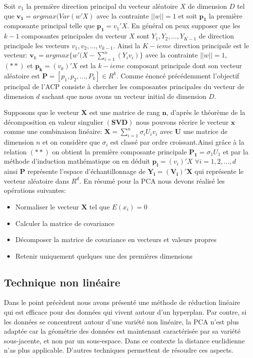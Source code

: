 \documentclass[twoside,twocolumn]{article}
\begin{document}
Soit $v_1$ la première direction principal du vecteur aléatoire $X$ de dimension $D$ tel que $ \mathbf{v_1}=argmax (Var(w'X) $ avec la contrainte $||w||=1$ et soit $ \mathbf{p_1}$ la première composante principal telle que $ \mathbf{p_1}=v_1'X$.
En général on peux supposer que les $k-1$ composantes principales du vecteur $X$ sont $  Y_1, Y_2, ..., Y_{K-1}$ de direction principale les vecteurs $ v_1,  v_2, ..., v_{k-1}$. Ainsi la $K-ieme$ direction principale est le vecteur:
$\mathbf v_k= argmax\lbrace w'(X-\sum_{i=1}^{n}\left (Y_iv_i\right)\rbrace $ avec la contrainte $||w||=1$, $\mathbf{ (**)}$ et $\mathbf{p_k}=(v_k)'X$ est la $k-ieme$ composant principale dont son vecteur aléatoire est $\mathbf{P}=[p_1, p_2, ..., P_k] \in R^k$. Comme énoncé précédemment l’objectif principal de l’ACP consiste à chercher les composantes principales du vecteur de dimension $d$ sachant que nous avons un vecteur initial de dimension $D$.\cite{Wang12}

Supposons que le vecteur $\mathbf{X}$ est une matrice de rang $\mathbf{n}$, d’après le théorème de la décomposition en valeur singulier $\mathbf{(SVD)}$ nous pouvons récrire le vecteur  $\mathbf{x}$ comme une combinaison linéaire: $\mathbf{X}= \sum_{i=1}^{n}{\sigma}_i  U_i  v_i $ avec $ \mathbf{U}$ une matrice de dimension $n$ et on considère que ${\sigma}_i$ est classé par ordre croissant.Ainsi grâce à la relation $\mathbf{(**)}$ on obtient la première composante principale $ \mathbf{P_1}={\sigma}_1 U_1$ et par la méthode d’induction mathématique on en déduit $\mathbf{p_i}=(v_i)'X$  $ \forall i = 1, 2, ..., d$ ainsi $\mathbf{P}$ représente l’espace d’échantillonnage de $\mathbf{Y_i=(V_i)'X}$ qui représente le vecteur aléatoire dans $R^d$\cite{Wang12}.
En résumé pour la PCA nous devons réalisé les opérations suivantes:
\begin{itemize}
\item Normaliser le vecteur $\mathbf{ X}$ tel que $E(x_i)=0$
\item Calculer la matrice de covariance
\item Décomposer la matrice de covariance en vecteurs et valeurs propres
\item Retenir uniquement quelques une des premières dimensions
\end{itemize}

\subsection{Technique non linéaire}
Dans le point précèdent nous avons présenté une méthode de réduction linéaire qui est efficace pour des  données qui vivent autour d'un hyperplan. Par contre, si les données se concentrent autour d'une variété non linéaire, la PCA n’est plus adaptée car la géométrie des données est maintenant caractérisée par sa variété sous-jacente, et non par un sous-espace. Dans ce contexte la distance euclidienne n’as plus applicable. D’autres techniques permettent de résoudre ces aspects.
\end{document}
